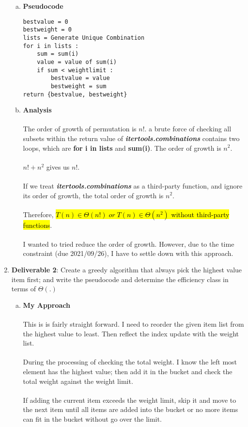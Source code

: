 \documentclass[11pt]{article}
\begin{document}
\begin{enumerate}
\begin{enumerate}[(a)]
		\item
		\textbf{Pseudocode}

		\lstset{basicstyle=\footnotesize}
		\begin{lstlisting}[xleftmargin=\dimexpr-\leftmarginii-\leftmargini]
bestvalue = 0
bestweight = 0
lists = Generate Unique Combination
for i in lists :
	sum = sum(i)
	value = value of sum(i)
	if sum < weightlimit :
		bestvalue = value
		bestweight = sum
return {bestvalue, bestweight}
		\end{lstlisting}

		\item
		\textbf{Analysis} \\\\
		The order of growth of permutation is $n!$. a brute force of checking all subsets within 
		 the return value of \textbf{\textit{itertools.combinations}} contains two loops, which are 
		 \textbf{for i in lists} and \textbf{sum(i)}. The order of growth is $n^2$. \\\\
		$n!+n^2$ gives us $n!$. \\\\
		If we treat \textbf{\textit{itertools.combinations}} as a third-party function, and ignore
		 its order of growth, the total order of growth is $n^2$. \\\\
		Therefore, \hl{$T(n) \in \Theta (n!) \; or \; T(n) \in \Theta (n^2)$ without third-party  functions}. \\\\
		I wanted to tried reduce the order of growth. However, due to the time constraint (due
		 2021/09/26), I have to settle down with this approach. \\
	\end{enumerate}
	
	\item
	\textbf{Deliverable 2}: Create a greedy algorithm that always pick the highest value item first; and write 
	 the pseudocode and determine the efficiency class in terms of $\Theta (.)$
	\begin{enumerate}[(a)]
		\item
		\textbf{My Approach} \\\\
		This is is fairly straight forward. I need to reorder the given item list from the highest
		 value to least. Then reflect the index update with the weight list. \\\\
		During the processing of checking the total weight. I know the left most element has the
		 highest value; then add it in the bucket and check the total weight against the weight
		 limit. \\\\
		If adding the current item exceeds the weight limit, skip it and move to the next item
		 until all items are added into the bucket or no more items can fit in the bucket without
		 go over the limit. \\\\


\end{enumerate}
\end{enumerate}
\end{document}

